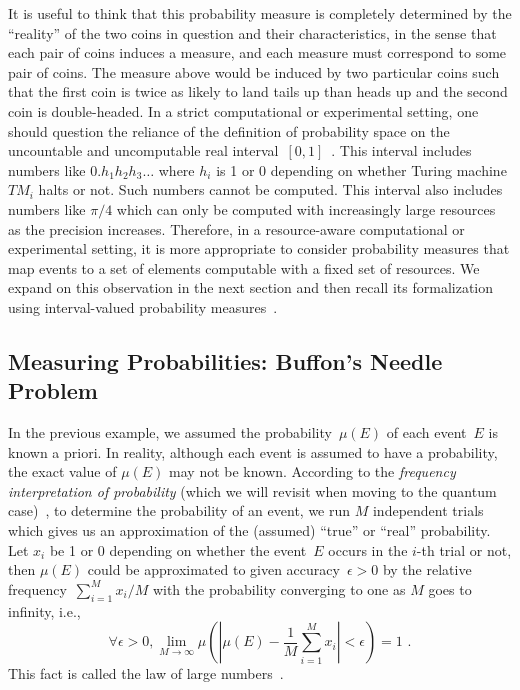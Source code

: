 \documentclass[12pt]{iopart}
\theoremstyle{remark}
\newcommand{\pmeas}{\ensuremath{\mu}}
\begin{document}
\noindent It is useful to think that this probability measure is
completely determined by the ``reality'' of the two coins in question
and their characteristics, in the sense that each pair of coins
induces a measure, and each measure must correspond to some pair of
coins. The measure above would be induced by two particular coins such
that the first coin is twice as likely to land tails up than heads up
and the second coin is double-headed. In a strict computational
or experimental setting, one should question the reliance of the
definition of probability space on the uncountable and
uncomputable real
interval~$[0,1]$~\cite{Turing_1937,Ziegler2007,weihrauch2012computable}.
This interval includes numbers like
$0.h_{1}h_{2}h_{3}\ldots$ where $h_{i}$ is 1 or 0 depending on whether
Turing machine $\mathit{TM}_{i}$ halts or not. Such numbers cannot be
computed. This interval also includes numbers like $\pi / 4$
which can only be computed with increasingly large resources as the
precision increases. Therefore, in a resource-aware computational or
experimental setting, it is more appropriate to consider probability
measures that map events to a set of elements computable with a fixed
set of resources. We expand on this observation in the next section
and then recall its formalization using interval-valued probability
measures~\cite{Weichselberger2000,JamisonLodwick2004}.

\subsection{Measuring Probabilities: Buffon's Needle Problem\label{subsec:Measuring-Probabilities:-Buffon}}

In the previous example, we assumed the probability~$\pmeas(E)$ of
each event~$E$ is known a priori. In reality, although each event is
assumed to have a probability, the exact value of $\pmeas(E)$ may not
be known. According to the \emph{frequency interpretation of
  probability} (which we will revisit when moving to the quantum
case)~\cite{Venn1876,Hajek2012}, 
to determine the probability of an event, we run $M$
independent trials which gives us an approximation of the (assumed)
``true'' or ``real'' probability. Let $x_{i}$ be 1 or 0 depending on
whether the event~$E$ occurs in the $i$-th trial or not, then
$\pmeas(E)$ could be approximated to given accuracy~$\epsilon>0$ by
the relative frequency~$\sum_{i=1}^{M}x_{i} / M$ with the
probability converging to one as $M$ goes to infinity, i.e.,
\begin{equation}
\forall\epsilon>0,\lim_{M\rightarrow\infty}\pmeas\left(\left|\pmeas(E)-\frac{1}{M}\sum_{i=1}^{M} x_{i}\right|<\epsilon\right)=1\textrm{ .}
\end{equation}
This fact is called the law of large numbers~\cite{Bernoulli2006,Kolmogorov1950,Uspensky1937,Shafer1976,544199}.
\end{document}
